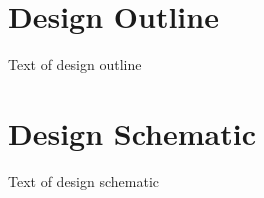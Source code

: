 \documentclass[12pt,english]{article}
\begin{document}

\section{Design Outline}
Text of design outline

\pagebreak



\section{Design Schematic}
Text of design schematic

\pagebreak


\end{document}
